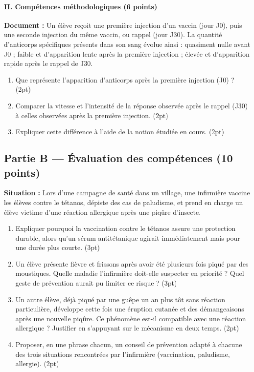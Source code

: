 \paragraph{II. Compétences méthodologiques (6 points)}
\noindent\textbf{Document :} Un élève reçoit une première injection d'un vaccin (jour
J0), puis une seconde injection du même vaccin, ou rappel (jour J30). La quantité
d'anticorps spécifiques présents dans son sang évolue ainsi : quasiment nulle avant J0
; faible et d'apparition lente après la première injection ; élevée et d'apparition
rapide après le rappel de J30.
\begin{enumerate}[label=\arabic*)]
\item Que représente l'apparition d'anticorps après la première injection (J0) ?
\hfill (2pt)
\item Comparer la vitesse et l'intensité de la réponse observée après le rappel (J30)
à celles observées après la première injection. \hfill (2pt)
\item Expliquer cette différence à l'aide de la notion étudiée en cours. \hfill (2pt)
\end{enumerate}

\subsection*{Partie B — Évaluation des compétences (10 points)}

\noindent\textbf{Situation :} Lors d'une campagne de santé dans un village, une
infirmière vaccine les élèves contre le tétanos, dépiste des cas de paludisme, et
prend en charge un élève victime d'une réaction allergique après une piqûre
d'insecte.

\begin{enumerate}[label=\textbf{Tâche \arabic*.}, leftmargin=2.2cm]
\item Expliquer pourquoi la vaccination contre le tétanos assure une protection
durable, alors qu'un sérum antitétanique agirait immédiatement mais pour une durée
plus courte. \hfill (3pt)
\item Un élève présente fièvre et frissons après avoir été plusieurs fois piqué par
des moustiques. Quelle maladie l'infirmière doit-elle suspecter en priorité ? Quel
geste de prévention aurait pu limiter ce risque ? \hfill (3pt)
\item Un autre élève, déjà piqué par une guêpe un an plus tôt sans réaction
particulière, développe cette fois une éruption cutanée et des démangeaisons après
une nouvelle piqûre. Ce phénomène est-il compatible avec une réaction allergique ?
Justifier en s'appuyant sur le mécanisme en deux temps. \hfill (2pt)
\item Proposer, en une phrase chacun, un conseil de prévention adapté à chacune des
trois situations rencontrées par l'infirmière (vaccination, paludisme, allergie).
\hfill (2pt)
\end{enumerate}

